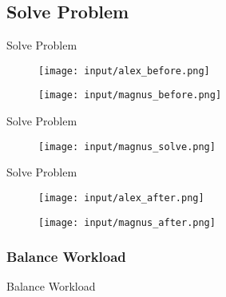\subsection{Solve Problem}
\begin{frame}{Solve Problem}
\begin{figure}[H]
	\centering
		\texttt{[image: input/alex\_before.png]}
	\label{fig:alex_before}
\end{figure}

\begin{figure}[H]
	\centering
		\texttt{[image: input/magnus\_before.png]}
	\label{fig:magnus_before}
\end{figure}
\end{frame}

\begin{frame}{Solve Problem}
\begin{figure}[H]
	\centering
		\texttt{[image: input/magnus\_solve.png]}
	\label{fig:magnus_solve}
\end{figure}
\end{frame}

\begin{frame}{Solve Problem}
\begin{figure}[H]
	\centering
		\texttt{[image: input/alex\_after.png]}
	\label{fig:alex_after}
\end{figure}

\begin{figure}[H]
	\centering
		\texttt{[image: input/magnus\_after.png]}
	\label{fig:magnus_after}
\end{figure}
\end{frame}

\subsubsection*{Balance Workload}
\begin{frame}{Balance Workload}
\end{frame}

